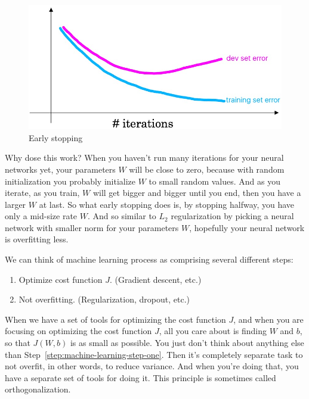 \documentclass[UTF8]{article}
\newcommand{\Vector}[1]{\boldsymbol{\mathit{#1}}}   %
\newcommand{\Matrix}[1]{\boldsymbol{\mathit{#1}}}   %
\begin{document}
\begin{figure}[htb]
    \centering
    \includegraphics[width=40em]{figures/early-stopping}
    \caption{Early stopping}
    \label{fig:early-stopping}
\end{figure}

Why dose this work? When you haven't run many iterations for your neural networks yet, your
parameters $\Matrix{W}$ will be close to zero, because with random initialization you
probably initialize $\Matrix{W}$ to small random values. And as you iterate, as you train,
$\Matrix{W}$ will get bigger and bigger until you end, then you have a larger $\Matrix{W}$ at last.
So what early stopping does is, by stopping halfway, you have only a mid-size rate $\Matrix{W}$.
And so similar to $L_2$ regularization by picking a neural network with smaller norm for your
parameters $\Matrix{W}$, hopefully your neural network is overfitting less.

We can think of machine learning process as comprising several different steps:
\begin{enumerate}
    \item Optimize cost function $J$. (Gradient descent, etc.)
    \label{step:machine-learning-step-one}
    \item Not overfitting. (Regularization, dropout, etc.)
    \label{step:machine-learning-step-two}
\end{enumerate}

When we have a set of tools for optimizing the cost function $J$, and when you are focusing on
optimizing the cost function $J$, all you care about is finding $\Matrix{W}$ and $\Vector{b}$, so
that $J(\Matrix{W}, \Vector{b})$ is as small as possible. You just don't think about anything else
than Step~\ref{step:machine-learning-step-one}. Then it's completely separate task to not
overfit, in other words, to reduce variance. And when you're doing that, you have a separate set of
tools for doing it. This principle is sometimes called orthogonalization.
\end{document}
